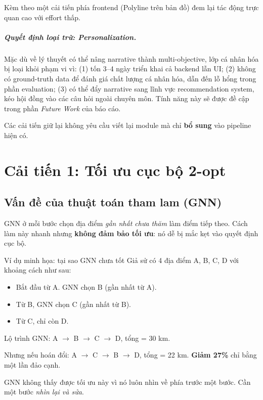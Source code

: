 \documentclass[12pt,a4paper]{report}
\begin{document}
Kèm theo một cải tiến phía frontend (Polyline trên bản đồ) đem lại tác động trực quan cao với effort thấp.

\paragraph{Quyết định loại trừ: Personalization.} Mặc dù về lý thuyết có thể nâng narrative thành multi-objective, lớp cá nhân hóa bị loại khỏi phạm vi vì: (1) tốn 3--4 ngày triển khai cả backend lẫn UI; (2) không có ground-truth data để đánh giá chất lượng cá nhân hóa, dẫn đến lỗ hổng trong phần evaluation; (3) có thể đẩy narrative sang lĩnh vực recommendation system, kéo hội đồng vào các câu hỏi ngoài chuyên môn. Tính năng này sẽ được đề cập trong phần \textit{Future Work} của báo cáo.

Các cải tiến giữ lại không yêu cầu viết lại module mà chỉ \textbf{bổ sung} vào pipeline hiện có.

\chapter{Cải tiến 1: Tối ưu cục bộ 2-opt}
\label{chap:2opt}

\section{Vấn đề của thuật toán tham lam (GNN)}

GNN ở mỗi bước chọn địa điểm \textit{gần nhất chưa thăm} làm điểm tiếp theo. Cách làm này nhanh nhưng \textbf{không đảm bảo tối ưu}: nó dễ bị mắc kẹt vào quyết định cục bộ.

\begin{anabox}{Ví dụ minh họa: tại sao GNN chưa tốt}
Giả sử có 4 địa điểm A, B, C, D với khoảng cách như sau:
\begin{itemize}
    \item Bắt đầu từ A. GNN chọn B (gần nhất từ A).
    \item Từ B, GNN chọn C (gần nhất từ B).
    \item Từ C, chỉ còn D.
\end{itemize}
Lộ trình GNN: A $\rightarrow$ B $\rightarrow$ C $\rightarrow$ D, tổng = 30 km.

Nhưng nếu hoán đổi: A $\rightarrow$ C $\rightarrow$ B $\rightarrow$ D, tổng = 22 km. \textbf{Giảm 27\%} chỉ bằng một lần đảo cạnh.

GNN không thấy được tối ưu này vì nó luôn nhìn về phía trước một bước. Cần một bước \textit{nhìn lại và sửa}.
\end{anabox}
\end{document}
